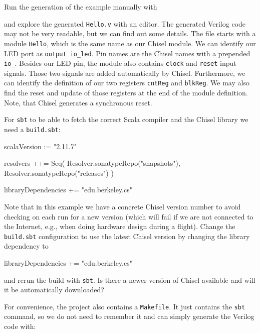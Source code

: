 \documentclass[%
    10pt,
    headinclude, footexclude,
    openright, %
    notitlepage,
    cleardoubleempty,
    headsepline,
    pointlessnumbers,
    bibtotoc, idxtotoc,
    ]{scrbook}
\newcommand{\code}[1]{{\small{\texttt{#1}}}}
\begin{document}

\noindent Run the generation of the example manually with


and explore the generated \code{Hello.v} with an editor. The generated Verilog code may not be
very readable, but we can find out some details. The file starts with a module \code{Hello},
which is the same name as our Chisel module. We can identify our LED port as
\code{output io\_led}. Pin names are the Chisel names with a prepended \code{io\_}.
Besides our LED pin, the module also contains \code{clock} and \code{reset} input signals.
Those two signals are added automatically by Chisel.
Furthermore, we can identify the definition of our two registers \code{cntReg} and \code{blkReg}.
We may also find the reset and update of those registers at the end of the module definition.
Note, that Chisel generates a synchronous reset.

For \code{sbt} to be able to fetch the correct Scala compiler and the Chisel library
we need a \code{build.sbt}:

\begin{chisel}
scalaVersion := "2.11.7"

resolvers ++= Seq(
  Resolver.sonatypeRepo("snapshots"),
  Resolver.sonatypeRepo("releases")
)

libraryDependencies += "edu.berkeley.cs" %
\end{chisel}

\noindent Note that in this example we have a concrete Chisel version number to avoid checking on
each run for a new version (which will fail if we are not connected to the Internet,
e.g., when doing hardware design during a flight).
Change the \code{build.sbt} configuration to use the latest Chisel version by changing the
library dependency to

\begin{chisel}
libraryDependencies += "edu.berkeley.cs" %
\end{chisel}

\noindent and rerun the build with \code{sbt}. Is there a newer version of Chisel
available and will it be automatically downloaded?

For convenience, the project also contains a \code{Makefile}.
It just contains the \code{sbt} command, so we do not need to remember it and
can simply generate the Verilog code with:
\end{document}
